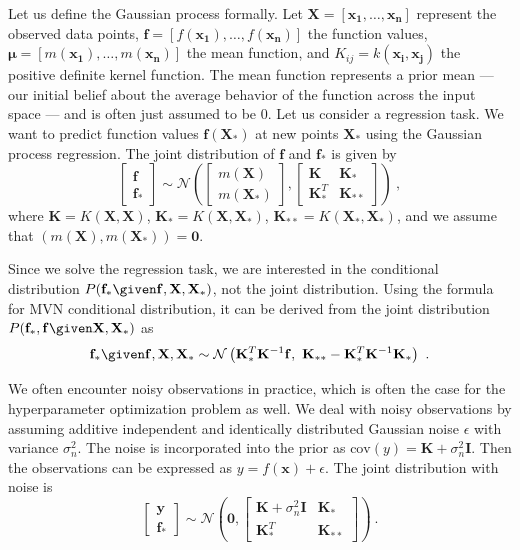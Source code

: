 Let us define the Gaussian process formally. Let $\mathbf{X}=[\mathbf{x_1}, \ldots ,\mathbf{x_n}]$ represent the observed data points, $\mathbf{f}=[f(\mathbf{x_1}), \ldots ,f(\mathbf{x_n})]$ the function values, $\mathbf{\mu}=[m(\mathbf{x_1}),\ldots , m(\mathbf{x_n})]$ the mean function, and $K_{ij}=k(\mathbf{x_i}, \mathbf{x_j})$ the positive definite kernel function. The mean function represents a prior mean --- our initial belief about the average behavior of the function across the input space --- and is often just assumed to be $0$. Let us consider a regression task. We want to predict function values $\mathbf{f}(\mathbf{X}_*)$ at new points $\mathbf{X}_*$ using the Gaussian process regression. The joint distribution of $\mathbf{f}$ and $\mathbf{f_*}$ is given by
\[
\begin{bmatrix}
    \mathbf{f} \\ \mathbf{f}_*
    \end{bmatrix}
    \sim
    \mathcal{N} \left(
    \begin{bmatrix}
    m(\mathbf{X}) \\ m(\mathbf{X}_*)
    \end{bmatrix} ,
    \begin{bmatrix}
    \mathbf{K} & \mathbf{K}_* \\
    \mathbf{K}_*^T & \mathbf{K}_{**}
    \end{bmatrix}
    \right) \ ,
\]
where $\mathbf{K}=K(\mathbf{X},\mathbf{X})$, $\mathbf{K}_*=K(\mathbf{X},\mathbf{X}_*)$, $\mathbf{K}_{**}=K(\mathbf{X}_*,\mathbf{X}_*)$, and we assume that $(m(\mathbf{X}),m(\mathbf{X_*}))=\mathbf{0}$.

Since we solve the regression task, we are interested in the conditional distribution $P(\mathbf{f}_* \given \mathbf{f},\mathbf{X}, \mathbf{X_*})$, not the joint distribution. Using the formula for MVN conditional distribution, it can be derived from the joint distribution $P(\mathbf{f}_*,\mathbf{f} \given \mathbf{X}, \mathbf{X_*})$ as
\[ \mathbf{f}_*  \given  \mathbf{f}, \mathbf{X}, \mathbf{X_*} \sim \mathcal{N} \left(
    \mathbf{K}^T_* \mathbf{K}^{-1} \mathbf{f}, \ \mathbf{K}_{**} - \mathbf{K}^T_* \mathbf{K}^{-1} \mathbf{K}_*
 \right) \ .
 \]

 We often encounter noisy observations in practice, which is often the case for the hyperparameter optimization problem as well. We deal with noisy observations by assuming additive independent and identically distributed Gaussian noise $\epsilon$ with variance $\sigma_n^2$. The noise is incorporated into the prior as $\text{cov}(y)= \mathbf{K}+\sigma_n^2 \mathbf{I}$. Then the observations can be expressed as $y=f(\mathbf{x})+ \epsilon$. The joint distribution with noise is
 \[
\begin{bmatrix}
    \mathbf{y} \\ \mathbf{f}_*
    \end{bmatrix}
    \sim
    \mathcal{N} \left(
    \mathbf{0},
    \begin{bmatrix}
    \mathbf{K} + \sigma^2_n \mathbf{I} & \mathbf{K}_* \\
    \mathbf{K}_*^T & \mathbf{K}_{**}
    \end{bmatrix}
    \right) \ .
\]

